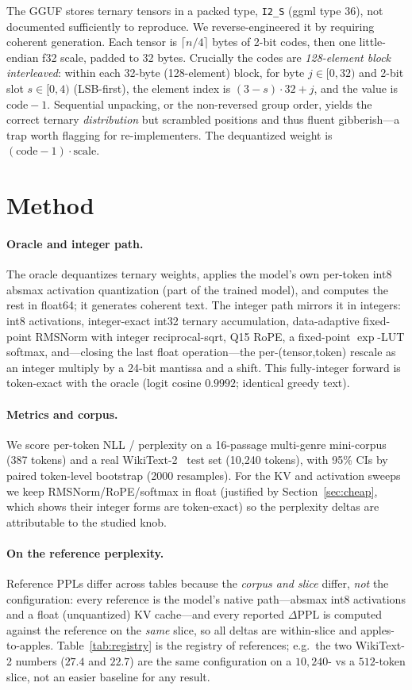 \documentclass[11pt]{article}
\begin{document}
The GGUF stores ternary tensors in a packed type, \texttt{I2\_S} (ggml type 36),
not documented sufficiently to reproduce. We reverse-engineered it by requiring
coherent generation. Each tensor is $\lceil n/4\rceil$ bytes of 2-bit codes, then one
little-endian f32 scale, padded to 32 bytes. Crucially the codes are
\emph{128-element block interleaved}: within each 32-byte (128-element) block, for
byte $j\in[0,32)$ and 2-bit slot $s\in[0,4)$ (LSB-first), the element index is
$(3-s)\cdot 32 + j$, and the value is $\text{code}-1$. Sequential unpacking, or the
non-reversed group order, yields the correct ternary \emph{distribution} but
scrambled positions and thus fluent gibberish---a trap worth flagging for
re-implementers. The dequantized weight is $(\text{code}-1)\cdot\text{scale}$.

\section{Method}
\paragraph{Oracle and integer path.} The oracle dequantizes ternary weights, applies
the model's own per-token int8 absmax activation quantization (part of the trained
model), and computes the rest in float64; it generates coherent text. The integer
path mirrors it in integers: int8 activations, integer-exact int32 ternary
accumulation, data-adaptive fixed-point RMSNorm with integer reciprocal-sqrt, Q15
RoPE, a fixed-point $\exp$-LUT softmax, and---closing the last float operation---the
per-(tensor,token) rescale as an integer multiply by a 24-bit mantissa and a shift.
This fully-integer forward is token-exact with the oracle (logit cosine $0.9992$;
identical greedy text).

\paragraph{Metrics and corpus.} We score per-token NLL / perplexity on a 16-passage
multi-genre mini-corpus (387 tokens) and a real WikiText-2~\cite{merity2017wikitext}
test set (10{,}240 tokens), with 95\% CIs by paired token-level bootstrap (2000
resamples). For the KV and activation sweeps we keep RMSNorm/RoPE/softmax in float
(justified by Section~\ref{sec:cheap}, which shows their integer forms are
token-exact) so the perplexity deltas are attributable to the studied knob.

\paragraph{On the reference perplexity.} Reference PPLs differ across tables because
the \emph{corpus and slice} differ, \emph{not} the configuration: every reference is
the model's native path---absmax int8 activations and a float (unquantized) KV
cache---and every reported $\Delta$PPL is computed against the reference on the
\emph{same} slice, so all deltas are within-slice and apples-to-apples.
Table~\ref{tab:registry} is the registry of references; e.g.\ the two WikiText-2
numbers ($27.4$ and $22.7$) are the same configuration on a $10{,}240$- vs a
$512$-token slice, not an easier baseline for any result.
\end{document}
